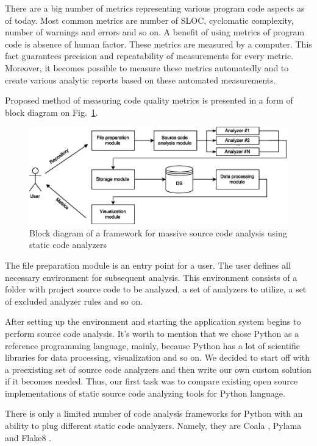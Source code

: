 \documentclass[runningheads,a4paper]{llncs}
\begin{document}
There are a big number of metrics representing various program code aspects
as of today. Most common metrics are number of SLOC, cyclomatic complexity,
number of warnings and errors and so on. A benefit of using metrics of program
code is absence of human factor. These metrics are measured by a computer.
This fact guarantees precision and repeatability of measurements for every
metric. Moreover, it becomes possible to measure these metrics automatedly
and to create various analytic reports based on these automated measurements.

Proposed method of measuring code quality metrics is presented in a form of
block diagram on Fig.~\ref{fig:structscheme}.

%
\begin{figure}
	\centering
	\includegraphics[width=\linewidth]{structscheme}
	\caption{Block diagram of a framework for massive source code analysis using static code analyzers}
	\label{fig:structscheme}
\end{figure}
%

The file preparation module is an entry point for a user. The user defines
all necessary environment for subsequent analysis. This environment consists
of a folder with project source code to be analyzed, a set of analyzers
to utilize, a set of excluded analyzer rules and so on.

After setting up the environment and starting the application system begins
to perform source code analysis. It's worth to mention that we chose Python
as a reference programming language, mainly, because Python has a lot of
scientific libraries for data processing, visualization and so on. We decided
to start off with a preexisting set of source code analyzers and then write
our own custom solution if it becomes needed. Thus, our first task was to
compare existing open source implementations of static source code
analyzing tools for Python language.

There is only a limited number of code analysis frameworks for Python with an ability
to plug different static code analyzers. Namely, they are Coala \cite{item13},
Pylama \cite{item14} and Flake8 \cite{item15}.
\end{document}
